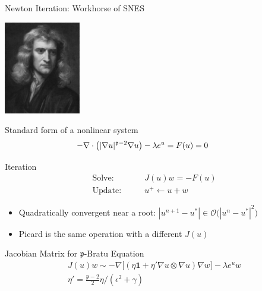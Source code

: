 \begin{frame}{Newton Iteration: Workhorse of SNES}
  \begin{flushright}
    \includegraphics[width=0.25\textwidth]{figures/Newton}
  \end{flushright}
  \vspace*{-4cm}
  \begin{block}{Standard form of a nonlinear system}
    \[ \hspace*{-1cm} -\nabla \cdot \bigl(\vert\nabla u\vert^{\mathfrak{p}-2} \nabla u \bigr) - \lambda e^u = F(u) = 0 \]
  \end{block}
  
  \begin{block}{Iteration}
    \vspace*{-0.5cm}
    \begin{align*}
      \text{Solve:} & \qquad J(u) w = -F(u) \\
      \text{Update:} & \qquad u^+ \gets u + w
    \end{align*}
    \begin{itemize}
    \item Quadratically convergent near a root: $|u^{n+1}-u^*| \in \mathcal{O} \Big(|u^n-u^*|^2\Big)$
    \item Picard is the same operation with a different $J(u)$
    \end{itemize}
  \end{block}
  
  \begin{block}{Jacobian Matrix for $\mathfrak{p}$-Bratu Equation}
    \vspace*{-0.5cm}
        \begin{gather*}
         J(u) w \sim -\nabla \bigl[ (\eta {\mathbf{1}} + \eta' \nabla u \otimes \nabla u) \nabla w \bigr] - \lambda e^u w \\
          \eta' = \frac{\mathfrak{p}-2}{2} \eta / (\epsilon^2 + \gamma)
        \end{gather*}
  \end{block}
\end{frame}


